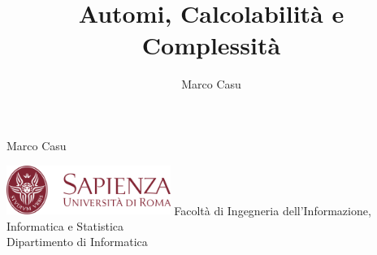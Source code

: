 \documentclass[10pt, letterpaper]{report}
\title{Automi, Calcolabilità e Complessità} %
\author{Marco Casu}
\date{\vspace{-5ex}}
\begin{document}
\usetikzlibrary{automata, arrows.meta, positioning}
\begin{titlepage}
    
\begin{center}
   \HUGE Marco Casu\acc
    \Huge \decothreeleft\hphantom{ }{\selectfont Automi, Calcolabilità e Complessità}\hphantom{ }\decothreeright
\end{center}
\thispagestyle{empty}
\begin{figure}[h]
\end{figure}
\vfill 
\centering \includegraphics[width=0.4\textwidth ]{../../../preamble/Stemma_sapienza.png} \acc
\centering \Large \color{sapienza}Facoltà di Ingegneria dell'Informazione,
Informatica e Statistica\\
Dipartimento di Informatica
\end{titlepage}
\end{document}
